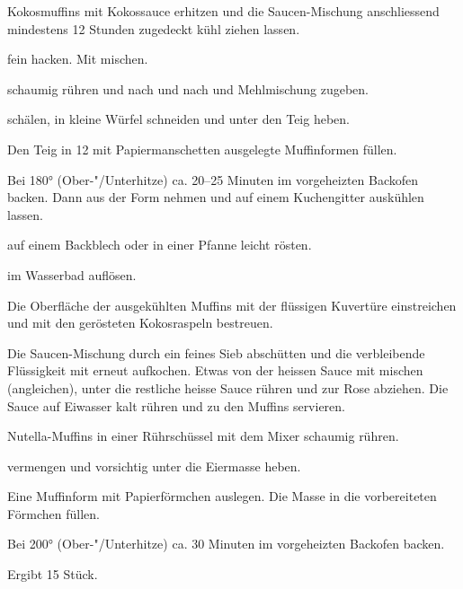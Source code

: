 \begin{recipe}{Kokosmuffins mit Kokossauce}
  erhitzen und die Saucen-Mischung anschliessend mindestens 12 Stunden
  zugedeckt kühl ziehen lassen.

  fein hacken. Mit
  mischen.

  schaumig rühren und nach und nach
  und Mehlmischung zugeben.
  
  schälen, in kleine Würfel schneiden und unter den Teig heben.

  Den Teig in 12 mit Papiermanschetten ausgelegte Muffinformen füllen.

  Bei 180° (Ober-"/Unterhitze) ca. 20--25 Minuten im vorgeheizten
  Backofen backen. Dann aus der Form nehmen und auf einem Kuchengitter
  auskühlen lassen.
  
  auf einem Backblech oder in einer Pfanne leicht rösten.

  im Wasserbad auflösen.

  Die Oberfläche der ausgekühlten Muffins mit der flüssigen Kuvertüre
  einstreichen und mit den gerösteten Kokosraspeln bestreuen.

  
  Die Saucen-Mischung durch ein feines Sieb abschütten und die
  verbleibende Flüssigkeit mit
  erneut aufkochen. Etwas von der heissen Sauce mit
  mischen (angleichen), unter die restliche heisse Sauce rühren und zur
  Rose abziehen. Die Sauce auf Eiwasser kalt rühren und zu den Muffins
  servieren.
\end{recipe}

\begin{recipe}{Nutella-Muffins}
  in einer Rührschüssel mit dem Mixer schaumig rühren.
  
  vermengen und vorsichtig unter die Eiermasse heben.

  Eine Muffinform mit Papierförmchen auslegen. Die Masse in die
  vorbereiteten Förmchen füllen.

  Bei 200° (Ober-"/Unterhitze) ca. 30 Minuten im vorgeheizten Backofen
  backen.

  Ergibt 15 Stück.
\end{recipe}

